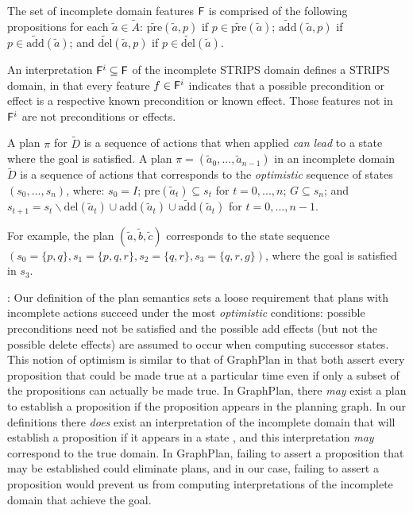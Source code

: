\documentclass[letterpaper]{article}
\def\und#1{\noindent{\bf #1}:}
\def\citep#1{\cite{#1}}
\begin{document}
The set of incomplete domain features ${\sf F}$ is comprised of the
following propositions for each $\tilde{a} \in \tilde{A}$:
 $\widetilde{\text{pre}}(\tilde{a}, p)$ if $p \in
 \widetilde{\text{pre}}(\tilde{a})$; $\widetilde{\text{add}}(\tilde{a}, p)$ if
 $p \in \widetilde{\text{add}}(\tilde{a})$; and
 $\widetilde{\text{del}}(\tilde{a}, p)$ if $p \in
 \widetilde{\text{del}}(\tilde{a})$.

An interpretation ${\sf F}^i \subseteq {\sf F}$ of the
incomplete STRIPS domain defines a STRIPS domain, in that every feature $f \in
{\sf F}^i$ indicates that a possible precondition or effect is a
respective known precondition or known effect. Those features not in ${\sf
F}^i$ are not preconditions or effects.

A plan $\pi$ for $\tilde{D}$ is a sequence of actions that when applied {\em
can lead} to a state where the goal is satisfied.  A plan $\pi = (\tilde{a}_0,
..., \tilde{a}_{n-1})$ in an incomplete domain $\tilde{D}$ is a sequence of
actions that corresponds to the {\em optimistic} sequence of states $(s_0, ...,
s_n)$, where: $s_0 = I$; $\text{pre}(\tilde{a}_t) \subseteq s_t$ for $t = 0,...,
n$; $G \subseteq s_n$; and $s_{t+1} = s_t \backslash \text{del}(\tilde{a}_t)
\cup \text{add}(\tilde{a}_t) \cup \widetilde{\text{add}}(\tilde{a}_t)$ for $t =
0,..., n-1$.

For example, the plan $(\tilde{a}, \tilde{b}, \tilde{c})$ corresponds to the
state sequence $(s_0 = \{p, q\}, s_1 = \{p, q, r\}, s_2 = \{q, r\}, s_3 = \{q,
r, g\})$, where the goal is satisfied in $s_3$.


\und{Discussion} Our definition of the plan semantics sets a loose requirement
that plans with incomplete actions succeed under the most  {\em optimistic}
conditions:  possible preconditions need not be satisfied and the possible add
effects (but not the possible delete effects) are assumed to occur when
computing successor states. This notion of optimism is similar to that of
GraphPlan \citep{graphplan} in that  both assert every proposition that could be
made true at a particular time even if only a subset of the propositions can
actually be made true.  In GraphPlan, there {\em may} exist a plan to establish
a proposition if the proposition appears in the planning graph. In our
definitions there {\em does} exist an interpretation of the incomplete domain
that will establish a proposition if it appears in a state
\citep{USU-CS-TR-11-001}, and this interpretation {\em may} correspond to the
true domain. In GraphPlan, failing to assert a proposition that may be
established could eliminate plans, and in our case, failing to assert a
proposition would prevent us from computing interpretations of the incomplete
domain that achieve the goal.
\end{document}
